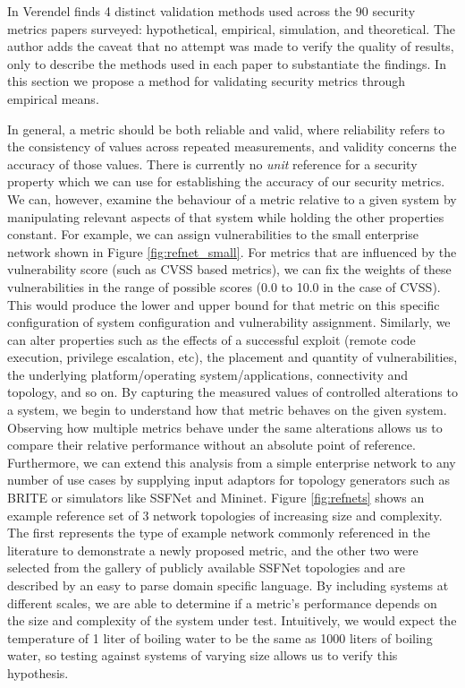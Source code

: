 


In \cite{Verendel_2009} Verendel finds 4 distinct validation methods used across the 90 security metrics papers surveyed: hypothetical, empirical, simulation, and theoretical. The author adds the caveat that no attempt was made to verify the quality of results, only to describe the methods used in each paper to substantiate the findings. In this section we propose a method for validating security metrics through empirical means.

In general, a metric should be both reliable and valid, where reliability refers to the consistency of values across repeated measurements, and validity concerns the accuracy of those values. There is currently no \textit{unit} reference for a security property which we can use for establishing the accuracy of our security metrics. We can, however, examine the behaviour of a metric relative to a given system by manipulating relevant aspects of that system while holding the other properties constant. For example, we can assign vulnerabilities to the small enterprise network shown in Figure \ref{fig:refnet_small}. For metrics that are influenced by the vulnerability score (such as CVSS based metrics), we can fix the weights of these vulnerabilities in the range of possible scores (0.0 to 10.0 in the case of CVSS). This would produce the lower and upper bound for that metric on this specific configuration of system configuration and vulnerability assignment. Similarly, we can alter properties such as the effects of a successful exploit (remote code execution, privilege escalation, etc), the placement and quantity of vulnerabilities, the underlying platform/operating system/applications, connectivity and topology, and so on. By capturing the measured values of controlled alterations to a system, we begin to understand how that metric behaves on the given system. Observing how multiple metrics behave under the same alterations allows us to compare their relative performance without an absolute point of reference. Furthermore, we can extend this analysis from a simple enterprise network to any number of use cases by supplying input adaptors for topology generators such as BRITE\cite{Medina_Lakhina_Matta_Byers_2001} or simulators like SSFNet\cite{Cowie_Ogielski_Nicol_2002} and Mininet\cite{Lantz_Heller_McKeown_2010}. Figure \ref{fig:refnets} shows an example reference set of 3 network topologies of increasing size and complexity. The first represents the type of example network commonly referenced in the literature to demonstrate a newly proposed metric, and the other two were selected from the gallery of publicly available SSFNet topologies and are described by an easy to parse domain specific language. By including systems at different scales, we are able to determine if a metric's performance depends on the size and complexity of the system under test. Intuitively, we would expect the temperature of 1 liter of boiling water to be the same as 1000 liters of boiling water, so testing against systems of varying size allows us to verify this hypothesis.

